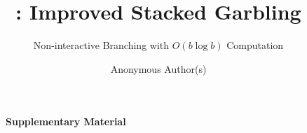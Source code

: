 \documentclass[]{llncs}
\title{%
  \ourschemelong: Improved Stacked Garbling
}
\subtitle{Non-interactive Branching with $O(b \log b)$ Computation}
\author{Anonymous Author(s)}
\institute{Anonymous Institution}
\author{}
\institute{}
\begin{document}
\maketitle




%



 

% 






\newpage

{\LARGE \bf \verb+    + Supplementary Material}

\begin{appendix}

\end{appendix}
\end{document}
